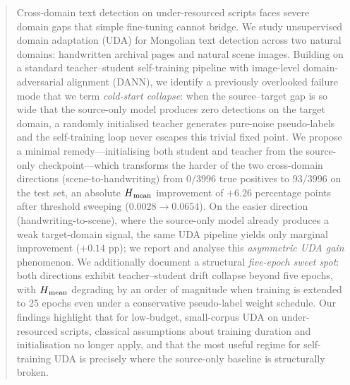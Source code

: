\begin{abstract}
Cross-domain text detection on under-resourced scripts faces severe domain
gaps that simple fine-tuning cannot bridge. We study unsupervised domain
adaptation (UDA) for Mongolian text detection across two natural domains:
handwritten archival pages and natural scene images. Building on a standard
teacher--student self-training pipeline with image-level domain-adversarial
alignment (DANN), we identify a previously overlooked failure mode that we
term \emph{cold-start collapse}: when the source--target gap is so wide that
the source-only model produces zero detections on the target domain, a
randomly initialised teacher generates pure-noise pseudo-labels and the
self-training loop never escapes this trivial fixed point. We propose a
minimal remedy---initialising both student and teacher from the source-only
checkpoint---which transforms the harder of the two cross-domain directions
(scene-to-handwriting) from $0/3996$ true positives to $93/3996$ on the test
set, an absolute $\hmean$ improvement of $+6.26$ percentage points after
threshold sweeping ($0.0028 \rightarrow 0.0654$).
On the easier direction (handwriting-to-scene), where the source-only model
already produces a weak target-domain signal, the same UDA pipeline yields
only marginal improvement ($+0.14$ pp); we report and analyse this
\emph{asymmetric UDA gain} phenomenon. We additionally document a structural
\emph{five-epoch sweet spot}: both directions exhibit teacher--student drift
collapse beyond five epochs, with $\hmean$ degrading by an order of magnitude
when training is extended to 25 epochs even under a conservative
pseudo-label weight schedule. Our findings highlight that for low-budget,
small-corpus UDA on under-resourced scripts, classical assumptions about
training duration and initialisation no longer apply, and that the most
useful regime for self-training UDA is precisely where the source-only
baseline is structurally broken.
\end{abstract}
